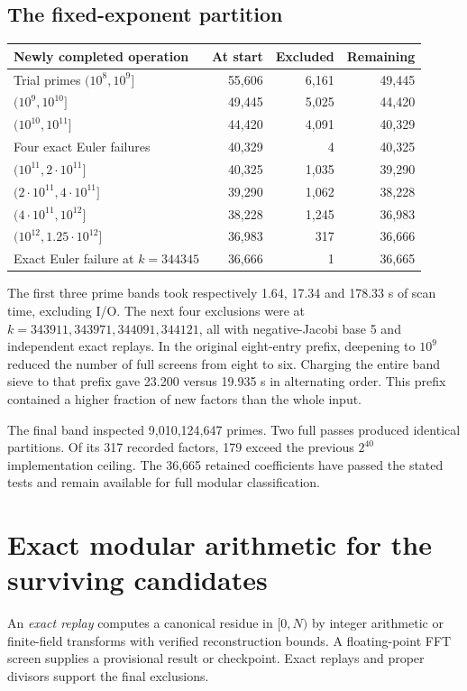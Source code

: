 \documentclass[11pt,a4paper,oneside,openany]{report}
\begin{document}
\section{The fixed-exponent partition}
\begin{center}\small
\begin{tabular}{@{}lrrr@{}}\toprule
Newly completed operation & At start & Excluded & Remaining\\\midrule
Trial primes $(10^8,10^9]$ &55,606&6,161&49,445\\
$(10^9,10^{10}]$ &49,445&5,025&44,420\\
$(10^{10},10^{11}]$ &44,420&4,091&40,329\\
Four exact Euler failures &40,329&4&40,325\\
$(10^{11},2\cdot10^{11}]$ &40,325&1,035&39,290\\
$(2\cdot10^{11},4\cdot10^{11}]$ &39,290&1,062&38,228\\
$(4\cdot10^{11},10^{12}]$ &38,228&1,245&36,983\\
$(10^{12},1.25\cdot10^{12}]$ &36,983&317&36,666\\
Exact Euler failure at $k=344345$ &36,666&1&36,665\\\bottomrule
\end{tabular}
\end{center}
The first three prime bands took respectively 1.64, 17.34 and 178.33 s of scan time, excluding I/O. The next four exclusions were at $k=343911,343971,344091,344121$, all with negative-Jacobi base 5 and independent exact replays. In the original eight-entry prefix, deepening to $10^9$ reduced the number of full screens from eight to six. Charging the entire band sieve to that prefix gave 23.200 versus 19.935 s in alternating order. This prefix contained a higher fraction of new factors than the whole input.

The final band inspected 9,010,124,647 primes. Two full passes produced identical partitions. Of its 317 recorded factors, 179 exceed the previous $2^{40}$ implementation ceiling. The 36,665 retained coefficients have passed the stated tests and remain available for full modular classification.

\chapter{Exact modular arithmetic for the surviving candidates}
\label{ch:exact}
\begingroup
\setlength{\parskip}{3pt plus 0.3pt minus 0.3pt}
\setlength{\abovedisplayskip}{5pt plus 1pt minus 1pt}
\setlength{\belowdisplayskip}{5pt plus 1pt minus 1pt}
An \emph{exact replay} computes a canonical residue in $[0,N)$ by integer arithmetic or finite-field transforms with verified reconstruction bounds. A floating-point FFT screen supplies a provisional result or checkpoint. Exact replays and proper divisors support the final exclusions.
\end{document}
